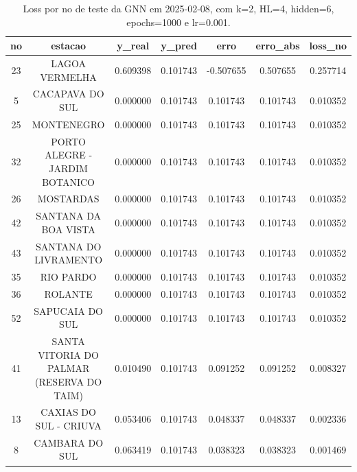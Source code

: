 \begin{table}[h]
\centering
\caption{Loss por no de teste da GNN em 2025-02-08, com k=2, HL=4, hidden=6, epochs=1000 e lr=0.001.}
\label{tab:gnn_loss_k2_hl4_h6_e1000_d20250208}
\begin{tabular}{ccccccc}
\toprule
no & estacao & y\_real & y\_pred & erro & erro\_abs & loss\_no \\
\midrule
23 & LAGOA VERMELHA & 0.609398 & 0.101743 & -0.507655 & 0.507655 & 0.257714 \\
5 & CACAPAVA DO SUL & 0.000000 & 0.101743 & 0.101743 & 0.101743 & 0.010352 \\
25 & MONTENEGRO & 0.000000 & 0.101743 & 0.101743 & 0.101743 & 0.010352 \\
32 & PORTO ALEGRE - JARDIM BOTANICO & 0.000000 & 0.101743 & 0.101743 & 0.101743 & 0.010352 \\
26 & MOSTARDAS & 0.000000 & 0.101743 & 0.101743 & 0.101743 & 0.010352 \\
42 & SANTANA DA BOA VISTA & 0.000000 & 0.101743 & 0.101743 & 0.101743 & 0.010352 \\
43 & SANTANA DO LIVRAMENTO & 0.000000 & 0.101743 & 0.101743 & 0.101743 & 0.010352 \\
35 & RIO PARDO & 0.000000 & 0.101743 & 0.101743 & 0.101743 & 0.010352 \\
36 & ROLANTE & 0.000000 & 0.101743 & 0.101743 & 0.101743 & 0.010352 \\
52 & SAPUCAIA DO SUL & 0.000000 & 0.101743 & 0.101743 & 0.101743 & 0.010352 \\
41 & SANTA VITORIA DO PALMAR (RESERVA DO TAIM) & 0.010490 & 0.101743 & 0.091252 & 0.091252 & 0.008327 \\
13 & CAXIAS DO SUL - CRIUVA & 0.053406 & 0.101743 & 0.048337 & 0.048337 & 0.002336 \\
8 & CAMBARA DO SUL & 0.063419 & 0.101743 & 0.038323 & 0.038323 & 0.001469 \\
\bottomrule
\end{tabular}
\end{table}
